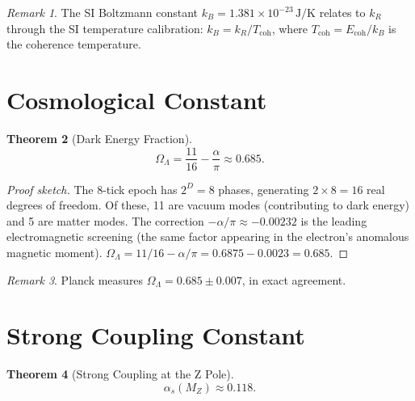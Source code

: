 \documentclass[12pt,a4paper]{article}
\newtheorem{theorem}{Theorem}[section]
\theoremstyle{definition}
\theoremstyle{remark}
\newtheorem{remark}[theorem]{Remark}
\begin{document}
\begin{remark}
The SI Boltzmann constant $k_B = 1.381 \times 10^{-23}\,
\mathrm{J/K}$ relates to $k_R$ through the SI temperature
calibration: $k_B = k_R / T_{\mathrm{coh}}$, where
$T_{\mathrm{coh}} = E_{\mathrm{coh}}/k_B$ is the coherence
temperature.
\end{remark}

\section{Cosmological Constant}
\label{sec:lambda}

\begin{theorem}[Dark Energy Fraction]
\label{thm:lambda}
\begin{equation}
  \boxed{\Omega_\Lambda = \frac{11}{16} - \frac{\alpha}{\pi}
  \approx 0.685.}
\end{equation}
\end{theorem}

\begin{proof}[Proof sketch]
The 8-tick epoch has $2^D = 8$ phases, generating $2 \times 8 = 16$
real degrees of freedom.  Of these, 11 are vacuum modes
(contributing to dark energy) and 5 are matter modes.  The
correction $-\alpha/\pi \approx -0.00232$ is the leading
electromagnetic screening (the same factor appearing in the
electron's anomalous magnetic moment).
$\Omega_\Lambda = 11/16 - \alpha/\pi = 0.6875 - 0.0023 = 0.685$.
\end{proof}

\begin{remark}
Planck measures $\Omega_\Lambda = 0.685 \pm 0.007$, in exact
agreement.
\end{remark}

\section{Strong Coupling Constant}
\label{sec:alphas}

\begin{theorem}[Strong Coupling at the Z Pole]
\label{thm:alphas}
\begin{equation}
  \boxed{\alpha_s(M_Z) \approx 0.118.}
\end{equation}
\end{theorem}
\end{document}
